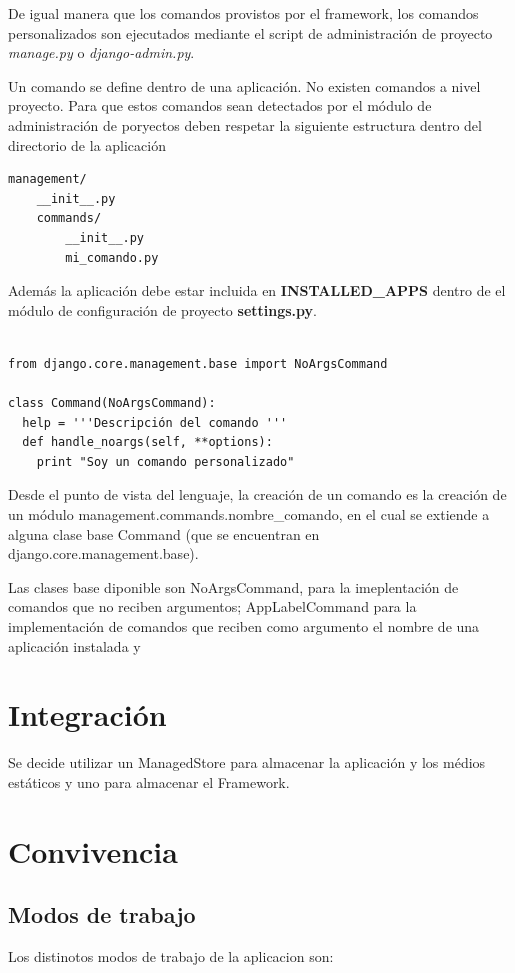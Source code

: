 \documentclass[a4paper]{report}
\begin{document}
De igual manera que los comandos provistos por el framework, los comandos
personalizados son ejecutados mediante el script de administración
de proyecto \emph{manage.py} o \emph{django-admin.py}.

Un comando se define dentro de una aplicación. No existen comandos a nivel
proyecto. Para que estos comandos sean detectados por el módulo de
administración de poryectos deben  respetar la siguiente estructura dentro del
directorio de la aplicación 
\begin{verbatim}
management/
    __init__.py
    commands/
        __init__.py
        mi_comando.py
\end{verbatim}

Además la aplicación debe estar incluida en \textbf{INSTALLED\_APPS}
dentro de el módulo de configuración de proyecto \textbf{settings.py}.

\begin{lstlisting}[style=python,
		   label=basic-django-command,
		   caption=Comando personalizado básico en Django]

from django.core.management.base import NoArgsCommand

class Command(NoArgsCommand):
  help = '''Descripción del comando '''
  def handle_noargs(self, **options):
    print "Soy un comando personalizado"

\end{lstlisting}

Desde el punto de vista del lenguaje, la creación de un comando es la creación
de un módulo management.commands.nombre\_comando, en el cual se extiende 
a alguna clase base Command (que se encuentran en django.core.management.base).

Las clases base diponible son NoArgsCommand, para la imeplentación de comandos
que no reciben argumentos; AppLabelCommand para la implementación de comandos
que reciben como argumento el nombre de una aplicación instalada y 

\section{Integración}
Se decide utilizar un ManagedStore para almacenar la aplicación y los médios
estáticos y uno para almacenar el Framework.

 
\section{Convivencia}

\subsection{Modos de trabajo}
Los distinotos modos de trabajo de la aplicacion son:
\end{document}
